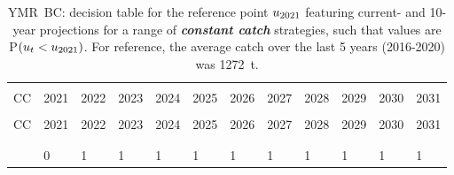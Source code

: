 \documentclass[11pt]{book}
\newcommand{\itbf}[1]{\textit{\textbf{#1}}}
\begin{document}
\begin{longtable}[c]{>{\raggedright\let\newline\\\arraybackslash\hspace{0pt}}p{0.5in}>{\raggedleft\let\newline\\\arraybackslash\hspace{0pt}}p{0.5in}>{\raggedleft\let\newline\\\arraybackslash\hspace{0pt}}p{0.5in}>{\raggedleft\let\newline\\\arraybackslash\hspace{0pt}}p{0.5in}>{\raggedleft\let\newline\\\arraybackslash\hspace{0pt}}p{0.53in}>{\raggedleft\let\newline\\\arraybackslash\hspace{0pt}}p{0.53in}>{\raggedleft\let\newline\\\arraybackslash\hspace{0pt}}p{0.53in}>{\raggedleft\let\newline\\\arraybackslash\hspace{0pt}}p{0.53in}>{\raggedleft\let\newline\\\arraybackslash\hspace{0pt}}p{0.53in}>{\raggedleft\let\newline\\\arraybackslash\hspace{0pt}}p{0.53in}>{\raggedleft\let\newline\\\arraybackslash\hspace{0pt}}p{0.53in}>{\raggedleft\let\newline\\\arraybackslash\hspace{0pt}}p{0.53in}}
  \caption{YMR~BC: decision table for the reference point $u_{2021}$ featuring current- and 10-year projections for a range of \itbf{constant catch} strategies, such that values are P$(u_t < u_{2021})$.  For reference, the average catch over the last 5 years (2016-2020) was 1272~t. } \label{tab:ymr.gmu.ucurr.CCs}\\  \hline\\[-2.2ex]  CC  & 2021 & 2022 & 2023 & 2024 & 2025 & 2026 & 2027 & 2028 & 2029 & 2030 & 2031 \\[0.2ex]\hline\\[-1.5ex]  \endfirsthead   \hline  CC  & 2021 & 2022 & 2023 & 2024 & 2025 & 2026 & 2027 & 2028 & 2029 & 2030 & 2031 \\[0.2ex]\hline\\[-1.5ex]  \endhead  \hline\\[-2.2ex]   \endfoot  \hline \endlastfoot  0 & 0 & 1 & 1 & 1 & 1 & 1 & 1 & 1 & 1 & 1 & 1 \\ 

\end{longtable}
\end{document}
